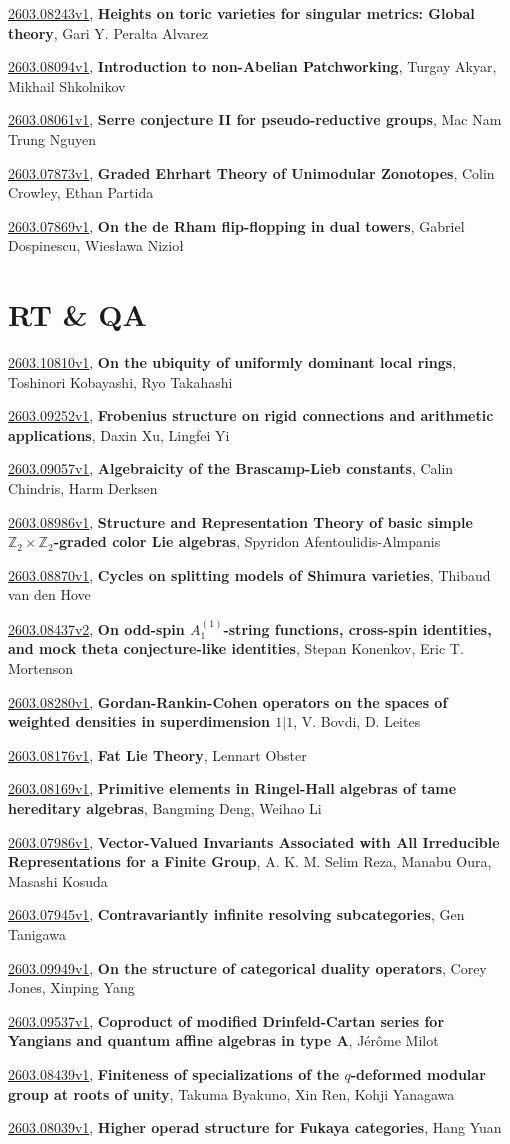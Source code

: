 \documentclass[9pt, a4paper]{article}
\theoremstyle{plain}
\theoremstyle{definition}
\theoremstyle{remark}
\newcommand{\arxiv}[3]{\href{https://arxiv.org/abs/#1}{#1}, \textbf{\textcolor{arxivblue}{#2}}, #3}
\begin{document}
\arxiv{2603.08243v1}{Heights on toric varieties for singular metrics: Global theory}{Gari Y. Peralta Alvarez}

\arxiv{2603.08094v1}{Introduction to non-Abelian Patchworking}{Turgay Akyar, Mikhail Shkolnikov}

\arxiv{2603.08061v1}{Serre conjecture II for pseudo-reductive groups}{Mac Nam Trung Nguyen}

\arxiv{2603.07873v1}{Graded Ehrhart Theory of Unimodular Zonotopes}{Colin Crowley, Ethan Partida}

\arxiv{2603.07869v1}{On the de Rham flip-flopping in dual towers}{Gabriel Dospinescu, Wiesława Nizioł}


\section{RT \& QA}
\arxiv{2603.10810v1}{On the ubiquity of uniformly dominant local rings}{Toshinori Kobayashi, Ryo Takahashi}

\arxiv{2603.09252v1}{Frobenius structure on rigid connections and arithmetic applications}{Daxin Xu, Lingfei Yi}

\arxiv{2603.09057v1}{Algebraicity of the Brascamp-Lieb constants}{Calin Chindris, Harm Derksen}

\arxiv{2603.08986v1}{Structure and Representation Theory of basic simple $\mathbb{Z}_2\times \mathbb{Z}_2$-graded color Lie algebras}{Spyridon Afentoulidis-Almpanis}

\arxiv{2603.08870v1}{Cycles on splitting models of Shimura varieties}{Thibaud van den Hove}

\arxiv{2603.08437v2}{On odd-spin $A_{1}^{(1)}$-string functions, cross-spin identities, and mock theta conjecture-like identities}{Stepan Konenkov, Eric T. Mortenson}

\arxiv{2603.08280v1}{Gordan-Rankin-Cohen operators on the spaces of weighted densities in superdimension $1\vert 1$}{V. Bovdi, D. Leites}

\arxiv{2603.08176v1}{Fat Lie Theory}{Lennart Obster}

\arxiv{2603.08169v1}{Primitive elements in Ringel-Hall algebras of tame hereditary algebras}{Bangming Deng, Weihao Li}

\arxiv{2603.07986v1}{Vector-Valued Invariants Associated with All Irreducible Representations for a Finite Group}{A. K. M. Selim Reza, Manabu Oura, Masashi Kosuda}

\arxiv{2603.07945v1}{Contravariantly infinite resolving subcategories}{Gen Tanigawa}

\arxiv{2603.09949v1}{On the structure of categorical duality operators}{Corey Jones, Xinping Yang}

\arxiv{2603.09537v1}{Coproduct of modified Drinfeld-Cartan series for Yangians and quantum affine algebras in type A}{Jérôme Milot}

\arxiv{2603.08439v1}{Finiteness of specializations of the $q$-deformed modular group at roots of unity}{Takuma Byakuno, Xin Ren, Kohji Yanagawa}

\arxiv{2603.08039v1}{Higher operad structure for Fukaya categories}{Hang Yuan}

\end{document}

